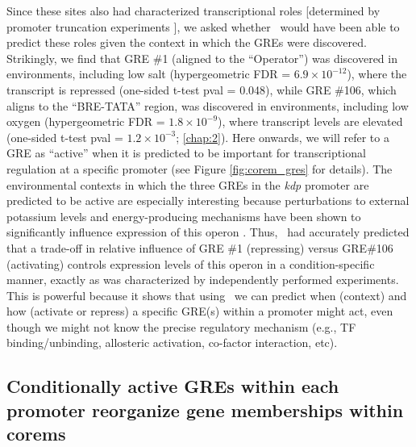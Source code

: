 Since these sites also had characterized transcriptional roles [determined by promoter truncation experiments \cite{kixmller_archaeal_2011}], we asked whether \egrine~would have been able to predict these roles given the context in which the GREs were discovered. Strikingly, we find that GRE \#1 (aligned to the “Operator”) was discovered in environments, including low salt (hypergeometric FDR = $6.9\times10^{-12}$), where the transcript is repressed (one-sided t-test pval = 0.048), while GRE \#106, which aligns to the “BRE-TATA” region, was discovered in environments, including low oxygen (hypergeometric FDR = $1.8\times10^{-9}$), where transcript levels are elevated (one-sided t-test pval = $1.2\times10^{-3}$; \ref{chap:2}). Here onwards, we will refer to a GRE as ``active'' when it is predicted to be important for transcriptional regulation at a specific promoter (see Figure \ref{fig:corem_gres} for details). The environmental contexts in which the three GREs in the \textit{kdp} promoter are predicted to be active are especially interesting because perturbations to external potassium levels and energy-producing mechanisms have been shown to significantly influence expression of this operon \cite{wurtmann_evolutionarily_2014}. Thus, \egrine~had accurately predicted that a trade-off in relative influence of GRE \#1 (repressing) versus GRE\#106 (activating) controls expression levels of this operon in a condition-specific manner, exactly as was characterized by independently performed experiments. This is powerful because it shows that using \egrine~we can predict when (context) and how (activate or repress) a specific GRE(s) within a promoter might act, even though we might not know the precise regulatory mechanism (e.g., TF binding/unbinding, allosteric activation, co-factor interaction, etc).

\subsection{Conditionally active GREs within each promoter reorganize gene memberships within corems}

